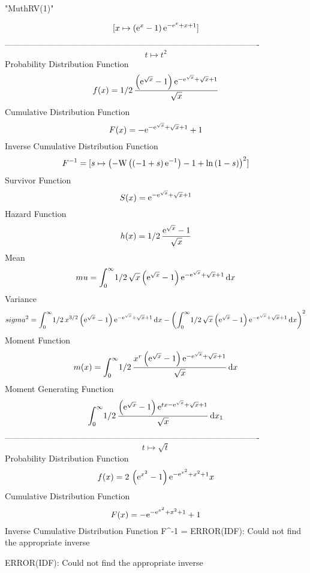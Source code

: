 \documentclass[12pt]{article}
\begin{document}
 
                                 "MuthRV(1)"

$$[x\mapsto  \left( {{\rm e}^{x}}-1 \right) {{\rm e}^{-{{\rm e}^{x}}+x+1
}}]
$$-------------------------------------------------------------------------------------------  \\$$t\mapsto {t}^{2}
$$Probability Distribution Function 
$$  f(x)=1/2\,{\frac { \left( {{\rm e}^{\sqrt {x}}}-1 \right) {{\rm e}^{-{
{\rm e}^{\sqrt {x}}}+\sqrt {x}+1}}}{\sqrt {x}}}
$$Cumulative Distribution Function  
 $$F(x)=-{{\rm e}^{-{{\rm e}^{\sqrt {x}}}+\sqrt {x}+1}}+1
$$ Inverse Cumulative Distribution Function 
  $$F^{-1} = [s\mapsto  \left( -{\rm W} \left( \left( -1+s \right) {{\rm e}^{-1}}
\right)-1+\ln  \left( 1-s \right)  \right) ^{2}]
$$Survivor Function 
 $$ S(x)={{\rm e}^{-{{\rm e}^{\sqrt {x}}}+\sqrt {x}+1}}
$$ Hazard Function 
 $$ h(x)=1/2\,{\frac {{{\rm e}^{\sqrt {x}}}-1}{\sqrt {x}}}
$$Mean 
 $$ mu=\int_{0}^{\infty }\!1/2\,\sqrt {x} \left( {{\rm e}^{\sqrt {x}}}-1
 \right) {{\rm e}^{-{{\rm e}^{\sqrt {x}}}+\sqrt {x}+1}}\,{\rm d}x
$$ Variance 
 $$ sigma^2 = \int_{0}^{\infty }\!1/2\,{x}^{3/2} \left( {{\rm e}^{\sqrt {x}}}-1
 \right) {{\rm e}^{-{{\rm e}^{\sqrt {x}}}+\sqrt {x}+1}}\,{\rm d}x-
 \left( \int_{0}^{\infty }\!1/2\,\sqrt {x} \left( {{\rm e}^{\sqrt {x}}
}-1 \right) {{\rm e}^{-{{\rm e}^{\sqrt {x}}}+\sqrt {x}+1}}\,{\rm d}x
 \right) ^{2}
$$Moment Function 
 $$ m(x) = \int_{0}^{\infty }\!1/2\,{\frac {{x}^{r} \left( {{\rm e}^{\sqrt {x}}}-
1 \right) {{\rm e}^{-{{\rm e}^{\sqrt {x}}}+\sqrt {x}+1}}}{\sqrt {x}}}
\,{\rm d}x
$$ Moment Generating Function 
 $$\int_{0}^{\infty }\!1/2\,{\frac { \left( {{\rm e}^{\sqrt {x}}}-1
 \right) {{\rm e}^{tx-{{\rm e}^{\sqrt {x}}}+\sqrt {x}+1}}}{\sqrt {x}}}
\,{\rm d}x_{{1}}
$$-------------------------------------------------------------------------------------------  \\$$t\mapsto \sqrt {t}
$$Probability Distribution Function 
$$  f(x)=2\, \left( {{\rm e}^{{x}^{2}}}-1 \right) {{\rm e}^{-{{\rm e}^{{x}^{2}}
}+{x}^{2}+1}}x
$$Cumulative Distribution Function  
 $$F(x)=-{{\rm e}^{-{{\rm e}^{{x}^{2}}}+{x}^{2}+1}}+1
$$ Inverse Cumulative Distribution Function 
  $$F^{-1} =              ERROR(IDF): Could not find the appropriate inverse

             ERROR(IDF): Could not find the appropriate inverse
\end{document}
